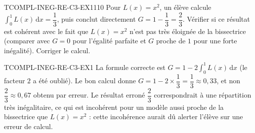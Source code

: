 

\begin{exercice}{TCOMPL-INEG-RE-C3-EX1}{1}{10}
Pour $L(x)=x^2$, un élève calcule $\displaystyle\int_0^1 L(x)\,\mathrm{d}x = \dfrac{1}{3}$, puis conclut directement $G = 1-\dfrac{1}{3} = \dfrac{2}{3}$. Vérifier si ce résultat est cohérent avec le fait que $L(x)=x^2$ n'est pas très éloignée de la bissectrice (comparer avec $G=0$ pour l'égalité parfaite et $G$ proche de $1$ pour une forte inégalité). Corriger le calcul.
\end{exercice}


\begin{corrige}{TCOMPL-INEG-RE-C3-EX1}
La formule correcte est $G = 1 - 2\displaystyle\int_0^1 L(x)\,\mathrm{d}x$ (le facteur $2$ a été oublié). Le bon calcul donne $G = 1-2\times\dfrac{1}{3} = \dfrac{1}{3} \approx 0{,}33$, et non $\dfrac{2}{3}\approx0{,}67$ obtenu par erreur. Le résultat erroné $\dfrac{2}{3}$ correspondrait à une répartition très inégalitaire, ce qui est incohérent pour un modèle aussi proche de la bissectrice que $L(x)=x^2$ : cette incohérence aurait dû alerter l'élève sur une erreur de calcul.
\end{corrige}
